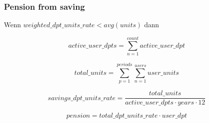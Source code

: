\subsubsection*{Pension from saving}

Wenn $weighted\_dpt\_units\_rate < avg(units)$ dann 

\begin{equation}
	active\_user\_dpts = 
	\sum_{n=1}^{count} active\_user\_dpt
\end{equation}

\begin{equation}
	total\_units = 	
	\sum_{p=1}^{periods} \sum_{n=1}^{users} user\_units	
\end{equation}

\begin{equation}
	savings\_dpt\_units\_rate = 	
	\frac{total\_units} 
	{active\_user\_dpts \cdot years \cdot 12}		
\end{equation}

\begin{equation}
	pension = total\_dpt\_units\_rate \cdot user\_dpt
\end{equation}